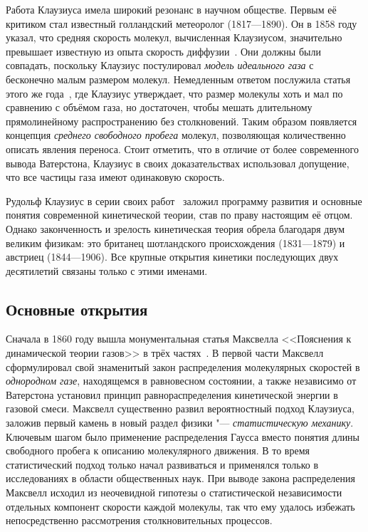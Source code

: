 \documentclass[a4paper, 12pt, oneside]{article} %
\begin{document}
Работа Клаузиуса имела широкий резонанс в научном обществе. Первым её
критиком стал известный голландский метеоролог  (1817---1890). Он в 1858 году указал, что средняя скорость
молекул, вычисленная Клаузиусом, значительно превышает известную из
опыта скорость диффузии~\cite{buys1858heat}. Они должны были совпадать,
поскольку Клаузиус постулировал \emph{модель идеального газа} с
бесконечно малым размером молекул. Немедленным ответом послужила статья
этого же года~\cite{clausius1858freepath}, где Клаузиус утверждает, что
размер молекулы хоть и мал по сравнению с объёмом газа, но достаточен,
чтобы мешать длительному прямолинейному распространению без
столкновений. Таким образом появляется концепция \emph{среднего
свободного пробега} молекул, позволяющая количественно описать явления
переноса. Стоит отметить, что в отличие от более современного вывода
Ватерстона, Клаузиус в своих доказательствах использовал допущение, что
все частицы газа имеют одинаковую скорость.

Рудольф Клаузиус в серии своих работ~\cite{clausius1937kinetics} заложил
программу развития и основные понятия современной кинетической теории,
став по праву настоящим её отцом. Однако законченность и зрелость
кинетическая теория обрела благодаря двум великим физикам: это британец
шотландского происхождения  (1831---1879) и
австриец  (1844---1906). Все крупные открытия
кинетики последующих двух десятилетий связаны только с этими именами.

\subsection{Основные открытия}

Сначала в 1860 году вышла монументальная статья Максвелла <<Пояснения к
динамической теории газов>> в трёх
частях~\cite{maxwell1860illustrations}. В первой части Максвелл
сформулировал свой знаменитый закон распределения молекулярных скоростей
в \emph{однородном газе}, находящемся в равновесном состоянии, а также
независимо от Ватерстона установил принцип равнораспределения
кинетической энергии в газовой смеси. Максвелл существенно развил
вероятностный подход Клаузиуса, заложив первый камень в новый раздел
физики "--- \emph{статистическую механику}. Ключевым шагом было
применение распределения Гаусса вместо понятия длины свободного пробега
к описанию молекулярного движения. В то время статистический подход
только начал развиваться и применялся только в исследованиях в области
общественных наук. При выводе закона распределения Максвелл исходил из
неочевидной гипотезы о статистической независимости отдельных компонент
скорости каждой молекулы, так что ему удалось избежать непосредственно
рассмотрения столкновительных процессов.
\end{document}
